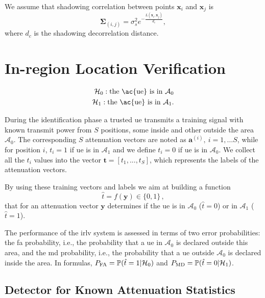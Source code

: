 \documentclass[conference]{IEEEtran}
\begin{document}
We assume that shadowing correlation between points $\bm{x}_i$ and $\bm{x}_j$ is
\begin{equation}\label{eq: coor mat}
    \bm{\Sigma}_{(i,j)} = \sigma_s^2e^{-\frac{L(\bm{x}_i,\bm{x}_j)}{d_c}},
\end{equation}
where $d_c$ is the shadowing decorrelation distance. 


\section{In-region Location Verification}\label{sec: ml}

 \begin{equation}
\begin{split}
  \mathcal H_0: \mbox{the \ac{ue} is in $\mathcal{A}_0$} \\
  \mathcal H_1: \mbox{the \ac{ue} is in $\mathcal{A}_1$}. 
  \end{split}
\end{equation}

During the identification phase a trusted \ac{ue} transmits a training signal with known transmit power from $S$ positions, some inside and other outside the area $\mathcal A_0$. The corresponding $S$ attenuation vectors are noted as $\bm{a}^{(i)}, \ i=1,\dots S$, while for position $i$, $t_i=1$ if \ac{ue} is in $\mathcal A_1$ and we define $t_i=0$ if \ac{ue} is in $\mathcal A_0$. We collect all the $t_i$ values into the vector $\bm{t}=[t_1,...,t_S]$, which  represents the labels of the attenuation vectors.

By using these training vectors and labels we aim at building a function
\begin{equation}
    \hat{t} = f(\bm{y}) \in \{0,1\}\,,
\end{equation}
that for an attenuation vector $\bm{y}$ determines if the \ac{ue} is in $\mathcal A_0$ ($\hat{t}=0$) or in $\mathcal A_1$ ($\hat{t}=1$).

The performance of the \ac{irlv} system is assessed in terms of two error probabilities: the \ac{fa} probability, i.e., the probability  that a \ac{ue} in $\mathcal A_0$ is declared outside this area, and the \ac{md} probability, i.e., the probability that a \ac{ue} outside $\mathcal A_0$ is declared inside the area. In formulas, $P_{\rm FA} ={\mathbb P}(\hat{t} =1 | \mathcal H_0)$ and  $P_{\rm MD}={\mathbb P}(\hat{t} = 0 | \mathcal H_1)$.

\subsection{Detector for Known Attenuation Statistics}
\end{document}
